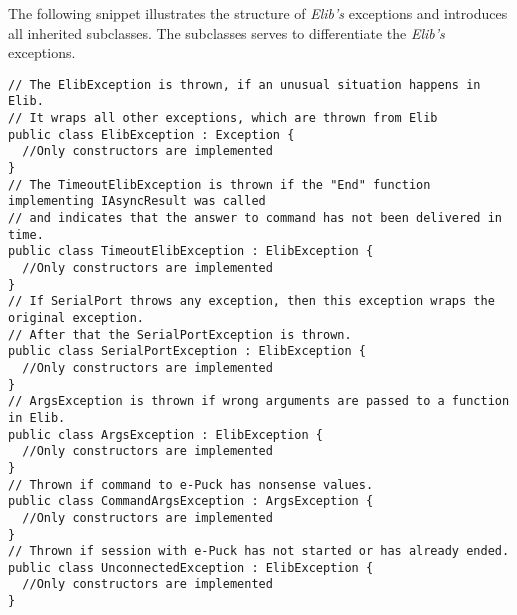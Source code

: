   The following snippet illustrates the structure of {\it Elib's} exceptions and
  introduces all inherited subclasses.
  The subclasses serves to differentiate the {\it Elib's} exceptions.
\begin{lstlisting}
// The ElibException is thrown, if an unusual situation happens in Elib.
// It wraps all other exceptions, which are thrown from Elib
public class ElibException : Exception { 
  //Only constructors are implemented
}
// The TimeoutElibException is thrown if the "End" function implementing IAsyncResult was called 
// and indicates that the answer to command has not been delivered in time.
public class TimeoutElibException : ElibException { 
  //Only constructors are implemented
}
// If SerialPort throws any exception, then this exception wraps the original exception.
// After that the SerialPortException is thrown.
public class SerialPortException : ElibException {
  //Only constructors are implemented
}
// ArgsException is thrown if wrong arguments are passed to a function in Elib.
public class ArgsException : ElibException {
  //Only constructors are implemented
}
// Thrown if command to e-Puck has nonsense values.
public class CommandArgsException : ArgsException {
  //Only constructors are implemented
}
// Thrown if session with e-Puck has not started or has already ended.
public class UnconnectedException : ElibException {
  //Only constructors are implemented
}

\end{lstlisting}
